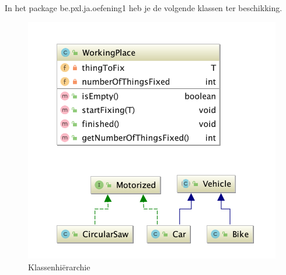 \begin{oefening}
In het package be.pxl.ja.oefening1 heb je de volgende klassen ter beschikking.

\begin{figure}[H]
\includegraphics{images/chapter_generics/bounds_exercise_diagram.png}
\caption{Klassenhi\"erarchie}
\label{fig:bounds_exercise}
\end{figure}


\end{oefening}
